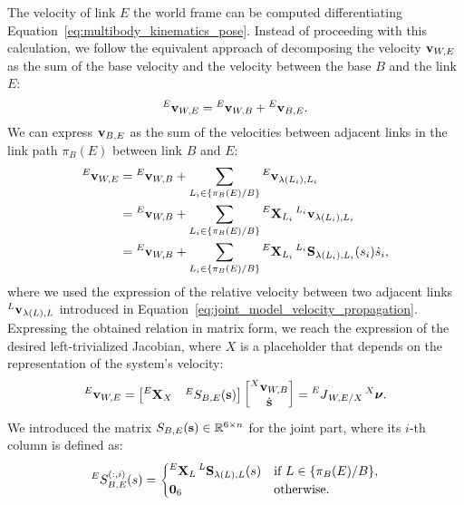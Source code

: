 The velocity of link $E$ \wrt the world frame can be computed differentiating Equation~\eqref{eq:multibody_kinematics_pose}.
Instead of proceeding with this calculation, we follow the equivalent approach of decomposing the velocity $\velsix_{W, E}$ as the sum of the base velocity and the velocity between the base $B$ and the link $E$:
%
\begin{equation*}
    \velsix[E]_{W,E} = \velsix[E]_{W,B} + \velsix[E]_{B,E}
    .
\end{equation*}
%
We can express $\velsix_{B, E}$ as the sum of the velocities between adjacent links in the link path $\pi_B(E)$ between link $B$ and $E$:
%
\begin{align*}
    \velsix[E]_{W,E}
    &= \velsix[E]_{W,B} + \sum_{L_i\in \{\pi_B(E) / B\}} \velsix[E]_{\lambda(L_i), L_i} \\
    &= \velsix[E]_{W,B} + \sum_{L_i\in \{\pi_B(E) / B\}} \transvel[E]_{L_i} \velsix[L_i]_{\lambda(L_i), L_i} \\
    &= \velsix[E]_{W,B} + \sum_{L_i\in \{\pi_B(E) / B\}} \transvel[E]_{L_i} \subspacee[L_i]_{\lambda(L_i), L_i}(\shape_i) \dot{\shape}_i
    ,
\end{align*}
%
where we used the expression of the relative velocity between two adjacent links $\velsix[L]_{\lambda(L),L}$ introduced in Equation~\eqref{eq:joint_model_velocity_propagation}.
Expressing the obtained relation in matrix form, we reach the expression of the desired left-trivialized Jacobian, where $X$ is a placeholder that depends on the representation of the system's velocity:
%
\begin{equation}
    \label{eq:jacobian_left_trivialized}
    \velsix[E]_{W,E} =
    \begin{bmatrix}
        \transvel[E]_X & {}^E S_{B,E}(\Shape)
    \end{bmatrix}
    \begin{bmatrix}
        \velsix[X]_{W,B} \\ \Shaped
    \end{bmatrix} =
    \jac[E]_{W,E/X} \Nu[X]
    .
\end{equation}
%
We introduced the matrix $S_{B,E}(\Shape) \in \realn^{6\times n}$ for the joint part, where its $i$-th column is defined as:
%
\begin{equation*}
    {}^E S_{B,E}^{(:,i)}(s) =
    \begin{cases}
        \transvel[E]_L \subspacee[L]_{\lambda(L), L}(\shape) &\text{if $L \in \{\pi_B(E) / B\}$,}\\
        \zeros_{6} &\text{otherwise.}
    \end{cases}
\end{equation*}

